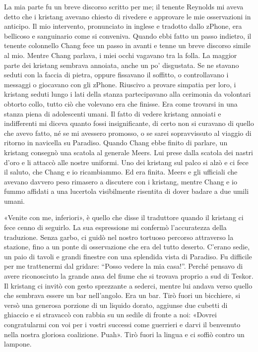 La mia parte fu un breve discorso scritto per me; il tenente Reynolds mi
aveva detto che i kristang avevano chiesto di rivedere e approvare le
mie osservazioni in anticipo. Il mio intervento, pronunciato in inglese
e tradotto dallo zPhone, era bellicoso e sanguinario come si conveniva.
Quando ebbi fatto un passo indietro, il tenente colonnello Chang fece un
passo in avanti e tenne un breve discorso simile al mio. Mentre Chang
parlava, i miei occhi vagavano tra la folla. La maggior parte dei
kristang sembrava annoiata, anche un po' disgustata. Se ne stavano
seduti con la faccia di pietra, oppure fissavano il soffitto, o
controllavano i messaggi o giocavano con gli zPhone. Riuscivo a provare
simpatia per loro, i kristang seduti lungo i lati della stanza
partecipavano alla cerimonia da volontari obtorto collo, tutto ciò che
volevano era che finisse. Era come trovarsi in una stanza piena di
adolescenti umani. Il fatto di vedere kristang annoiati e indifferenti
mi diceva quanto fossi insignificante, di certo non si curavano di
quello che avevo fatto, né se mi avessero promosso, o se sarei
sopravvissuto al viaggio di ritorno in navicella su Paradiso. Quando
Chang ebbe finito di parlare, un kristang consegnò una scatola al
generale Meers. Lui prese dalla scatola dei nastri d'oro e li attaccò
alle nostre uniformi. Uno dei kristang sul palco si alzò e ci fece il
saluto, che Chang e io ricambiammo. Ed era finita. Meers e gli ufficiali
che avevano davvero peso rimasero a discutere con i kristang, mentre
Chang e io fummo affidati a una lucertola visibilmente risentita di
dover badare a due umili umani.

«Venite con me, inferiori», è quello che disse il traduttore quando il
kristang ci fece cenno di seguirlo. La sua espressione mi confermò
l'accuratezza della traduzione. Senza garbo, ci guidò nel nostro
tortuoso percorso attraverso la stazione, fino a un ponte di
osservazione che era del tutto deserto. C'erano sedie, un paio di tavoli
e grandi finestre con una splendida vista di Paradiso. Fu difficile per
me trattenermi dal gridare: ``Posso vedere la mia casa!''. Perché
pensavo di avere riconosciuto la grande ansa del fiume che si trovava
proprio a sud di Teskor. Il kristang ci invitò con gesto sprezzante a
sederci, mentre lui andava verso quello che sembrava essere un bar
nell'angolo. Era un bar. Tirò fuori un bicchiere, si versò una generosa
porzione di un liquido dorato, aggiunse due cubetti di ghiaccio e si
stravaccò con rabbia su un sedile di fronte a noi: «Dovrei congratularmi
con voi per i vostri successi come guerrieri e darvi il benvenuto nella
nostra gloriosa coalizione. Puah». Tirò fuori la lingua e ci soffiò
contro un lampone.

